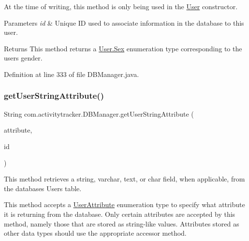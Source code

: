 At the time of writing, this method is only being used in the \mbox{\hyperlink{classcom_1_1activitytracker_1_1_user}{User}} constructor.


\begin{DoxyParams}{Parameters}
{\em id} & Unique ID used to associate information in the database to this user.\\
\hline
\end{DoxyParams}
\begin{DoxyReturn}{Returns}
This method returns a \mbox{\hyperlink{enumcom_1_1activitytracker_1_1_user_1_1_sex}{User.\+Sex}} enumeration type corresponding to the user\textquotesingle{}s gender. 
\end{DoxyReturn}


Definition at line 333 of file D\+B\+Manager.\+java.

\mbox{\label{classcom_1_1activitytracker_1_1_d_b_manager_a20f726c054d6c8a6fc3ce629d87f1114}} 
\subsubsection{\texorpdfstring{get\+User\+String\+Attribute()}{getUserStringAttribute()}}
{\footnotesize\ttfamily String com.\+activitytracker.\+D\+B\+Manager.\+get\+User\+String\+Attribute (\begin{DoxyParamCaption}\item[{final \mbox{\hyperlink{enumcom_1_1activitytracker_1_1_user_attribute}{User\+Attribute}}}]{attribute,  }\item[{final int}]{id }\end{DoxyParamCaption})}

This method retrieves a string, varchar, text, or char field, when applicable, from the database\textquotesingle{}s Users table.

This method accepts a \mbox{\hyperlink{enumcom_1_1activitytracker_1_1_user_attribute}{User\+Attribute}} enumeration type to specify what attribute it is returning from the database. Only certain attributes are accepted by this method, namely those that are stored as string-\/like values. Attributes stored as other data types should use the appropriate accessor method.



